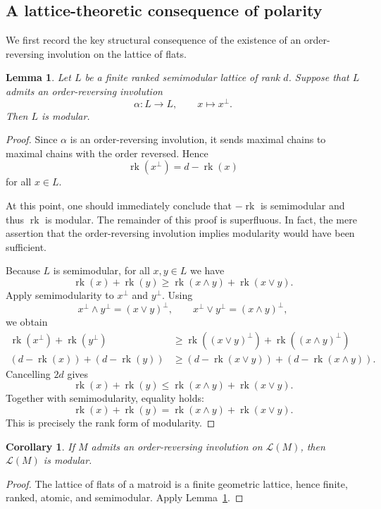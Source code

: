 \documentclass[12pt]{article}
\newcommand{\rk}{\operatorname{rk}}
\newcommand{\cL}{\mathcal L}
\theoremstyle{plain}
\newtheorem{lemma}[theorem]{Lemma}
\newtheorem{corollary}[theorem]{Corollary}
\theoremstyle{definition}
\newcommand{\review}[1]{\begin{reviewbox}#1\end{reviewbox}}
\begin{document}
\subsection{A lattice-theoretic consequence of polarity}

We first record the key structural consequence of the existence of an order-reversing involution on the lattice of flats.

\begin{lemma}\label{lem:selfdual-implies-modular}
Let \(L\) be a finite ranked semimodular lattice of rank \(d\).  Suppose that \(L\) admits an order-reversing involution
\[
   \alpha:L\longrightarrow L,\qquad x\longmapsto x^\perp .
\]
Then \(L\) is modular.
\end{lemma}

\begin{proof}
Since \(\alpha\) is an order-reversing involution, it sends maximal chains to maximal chains with the order reversed.  Hence
\[
   \rk(x^\perp)=d-\rk(x)
\]
for all \(x\in L\).
\review{At this point, one should immediately conclude that $-\rk$ is semimodular and thus $\rk$ is modular.
The remainder of this proof is superfluous. In fact, the mere assertion that the order-reversing involution implies modularity would have been sufficient.}

Because \(L\) is semimodular, for all \(x,y\in L\) we have
\[
   \rk(x)+\rk(y)\ge \rk(x\wedge y)+\rk(x\vee y).
\]
Apply semimodularity to \(x^\perp\) and \(y^\perp\).  Using
\[
   x^\perp\wedge y^\perp=(x\vee y)^\perp,
   \qquad
   x^\perp\vee y^\perp=(x\wedge y)^\perp,
\]
we obtain
\[
\begin{aligned}
  \rk(x^\perp)+\rk(y^\perp)
  &\ge
  \rk((x\vee y)^\perp)+\rk((x\wedge y)^\perp)\\
  (d-\rk(x))+(d-\rk(y))
  &\ge
  (d-\rk(x\vee y))+(d-\rk(x\wedge y)).
\end{aligned}
\]
Cancelling \(2d\) gives
\[
   \rk(x)+\rk(y)\le \rk(x\wedge y)+\rk(x\vee y).
\]
Together with semimodularity, equality holds:
\[
   \rk(x)+\rk(y)=\rk(x\wedge y)+\rk(x\vee y).
\]
This is precisely the rank form of modularity.
\end{proof}

\begin{corollary}\label{cor:M-modular}
If \(M\) admits an order-reversing involution on \(\cL(M)\), then \(\cL(M)\) is modular.
\end{corollary}

\begin{proof}
The lattice of flats of a matroid is a finite geometric lattice, hence finite, ranked, atomic, and semimodular.  Apply Lemma~\ref{lem:selfdual-implies-modular}.
\end{proof}
\end{document}
